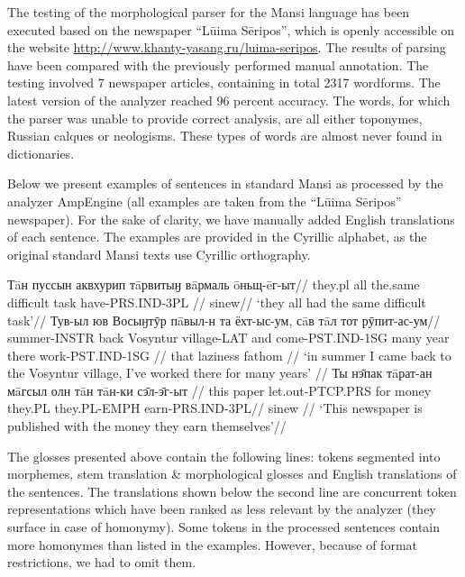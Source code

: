 \documentclass[b5paper,notitlepage]{article}
\begin{document}
The testing of the morphological parser for the Mansi language has been executed based on the newspaper “Lūima Sēripos”, which is openly accessible on the website \url{http://www.khanty-yasang.ru/luima-seripos}. The results of parsing have been compared with the previously performed manual annotation. The testing involved 7 newspaper articles, containing in total 2317 wordforms. The latest version of the analyzer reached 96 percent accuracy. The words, for which the parser was unable to provide correct analysis, are all either toponymes, Russian calques or neologisms. These types of words are almost never found in dictionaries.

Below we present examples of sentences in standard Mansi as processed by the analyzer AmpEngine (all examples are taken from the “Lūima Sēripos” newspaper). For the sake of clarity, we have manually added English translations of each sentence. The examples are provided in the Cyrillic alphabet, as the original standard Mansi texts use Cyrillic orthography.

\pex[interpartskip=3ex]
\a
\begingl
\gla Тāн пуссын аквхурип тāрвитыӈ вāрмаль ōньщ-ēг-ыт//
\glb they.{\sc pl} all the.same difficult task have-{\sc PRS.IND}-{\sc 3PL} //
\glc sinew//
\glft ‘they all had the same difficult task’//
\endgl
\a
\begingl[aboveglftskip=2ex]
\gla Тув-ыл юв Восыӈтӯр пāвыл-н та ёхт-ыс-ум, сāв тāл тот рӯпит-ас-ум//
\glb summer-{\sc INSTR} back Vosyntur village-{\sc LAT} and come-{\sc PST.IND}-{\sc 1SG} many year there work-{\sc PST.IND}-{\sc 1SG} //
\glc {} {} {} {} that {} laziness fathom {} {} //
\glft ‘in summer I came back to the Vosyntur village, I’ve worked there for many years’ //
\endgl
\a
\begingl[aboveglftskip=0pt]
\gla Ты нэ̄пак тāрат-ан	мāгсыл олн тāн тāн-ки сэ̄л-э̄г-ыт //
\glb this paper let.out-{\sc PTCP.PRS} for money they.{\sc PL} they.{\sc PL}-{\sc EMPH} earn-{\sc PRS.IND}-{\sc 3PL}//
\glc {} {} {} {} {} sinew {} {} //
\glft ‘This newspaper is published with the money they earn themselves’//
\endgl
\xe

The glosses presented above contain the following lines: tokens segmented into morphemes, stem translation & morphological glosses and English translations of the sentences.
The translations shown below the second line are concurrent token representations which have been ranked as less relevant by the analyzer (they surface in case of homonymy). Some tokens in the processed sentences contain more homonymes than listed in the examples. However, because of format restrictions, we had to omit them. 
\end{document}
